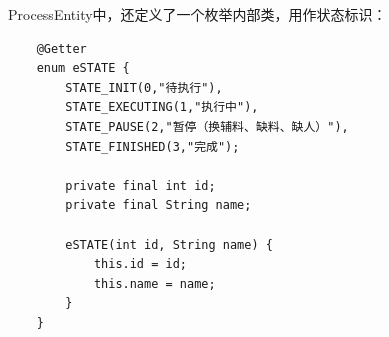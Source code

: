 ProcessEntity中，还定义了一个枚举内部类，用作状态标识：
\begin{lstlisting}
    @Getter
    enum eSTATE {
        STATE_INIT(0,"待执行"),
        STATE_EXECUTING(1,"执行中"),
        STATE_PAUSE(2,"暂停（换辅料、缺料、缺人）"),
        STATE_FINISHED(3,"完成");

        private final int id;
        private final String name;

        eSTATE(int id, String name) {
            this.id = id;
            this.name = name;
        }
    }
\end{lstlisting}\vspace{-30pt}

